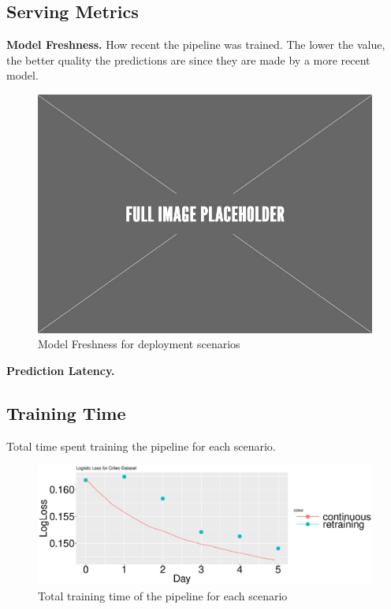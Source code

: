 \subsection{Serving Metrics}
\textbf{Model Freshness. }
How recent the pipeline was trained. 
The lower the value, the better quality the predictions are since they are made by a more recent model.
\begin{figure}[h]
\centering
\includegraphics[width=\columnwidth]{../images/placeholder.jpeg}
\caption{Model Freshness for deployment scenarios}
\label{fig:model-freshness-criteo}
\vspace{2mm}
\end{figure}
\textbf{Prediction Latency. }

\subsection{Training Time}
Total time spent training the pipeline for each scenario.
\begin{figure}[h]
\centering
\includegraphics[width=\columnwidth]{../images/experiment-results/criteo-log-loss-continuous-vs-daily.eps}
\caption{Total training time of the pipeline for each scenario}
\label{fig:training-time-criteo}
\vspace{2mm}
\end{figure}

